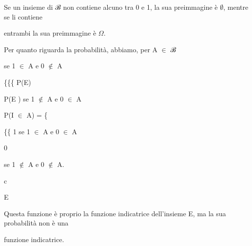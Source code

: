\documentclass[a4paper,portrait,12pt]{article}
\begin{document}
\begin{flushleft}
Se un insieme di ℬ non contiene alcuno tra 0 e 1, la sua preimmagine \`{e} $\emptyset$, mentre se li contiene
\end{flushleft}


\begin{flushleft}
entrambi la sua preimmagine \`{e} $\Omega$.
\end{flushleft}


\begin{flushleft}
Per quanto riguarda la probabilit\`{a}, abbiamo, per A $\in$ ℬ
\end{flushleft}


\begin{flushleft}
se 1 $\in$ A e 0 $\notin$ A
\end{flushleft}


\begin{flushleft}
\{\{\{ P(E)
\end{flushleft}


\begin{flushleft}
P(E ) se 1 $\notin$ A e 0 $\in$ A
\end{flushleft}


\begin{flushleft}
P(I $\in$ A) = \{
\end{flushleft}


\begin{flushleft}
\{\{ 1 se 1 $\in$ A e 0 $\in$ A
\end{flushleft}


0


\begin{flushleft}
se 1 $\notin$ A e 0 $\notin$ A.
\end{flushleft}


\begin{flushleft}
c
\end{flushleft}





\begin{flushleft}
E
\end{flushleft}





\begin{flushleft}
Questa funzione \`{e} proprio la funzione indicatrice dell'insieme E, ma la sua probabilit\`{a} non \`{e} una
\end{flushleft}


\begin{flushleft}
funzione indicatrice.
\end{flushleft}
\end{document}
